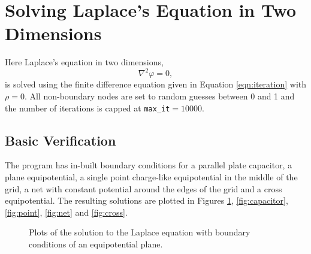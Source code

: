 \section{Solving Laplace's Equation in Two Dimensions}
\label{sec:laplace}

Here Laplace's equation in two dimensions,
\begin{equation}
    \nabla^2 \varphi = 0,
\end{equation}
is solved using the finite difference equation given in Equation \ref{eqn:iteration} with $\rho = 0$. All non-boundary nodes are set to random guesses between 0 and 1 and the number of iterations is capped at \texttt{max\_it}$=10000$.

\subsection{Basic Verification}
\label{subsec:basic_verification}

The program has in-built boundary conditions for a parallel plate capacitor, a plane equipotential, a single point charge-like equipotential in the middle of the grid, a net with constant potential around the edges of the grid and a cross equipotential. The resulting solutions are plotted in Figures \ref{fig:plane}, \ref{fig:capacitor}, \ref{fig:point}, \ref{fig:net} and \ref{fig:cross}.

\begin{figure}
    \centering
    \caption{Plots of the solution to the Laplace equation with boundary conditions of an equipotential plane.}
    \label{fig:plane}
\end{figure}

